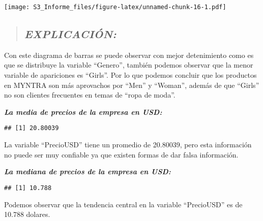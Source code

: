 \documentclass[
]{article}
\newenvironment{Shaded}{\begin{snugshade}}{\end{snugshade}}
\newcommand{\FunctionTok}[1]{\textcolor[rgb]{0.00,0.00,0.00}{#1}}
\newcommand{\NormalTok}[1]{#1}
\newcommand{\OtherTok}[1]{\textcolor[rgb]{0.56,0.35,0.01}{#1}}
\newcommand{\SpecialCharTok}[1]{\textcolor[rgb]{0.00,0.00,0.00}{#1}}
\begin{document}
\texttt{[image: S3\_Informe\_files/figure-latex/unnamed-chunk-16-1.pdf]}

\begin{quote}
\hypertarget{explicaciuxf3n-2}{%
\subsection{\texorpdfstring{\textbf{\emph{EXPLICACIÓN:}}}{EXPLICACIÓN:}}\label{explicaciuxf3n-2}}
\end{quote}

Con este diagrama de barras se puede observar con mejor detenimiento
como es que se distribuye la variable ``Genero'', también podemos
observar que la menor variable de apariciones es ``Girls''. Por lo que
podemos concluir que los productos en MYNTRA son más aprovachos por
``Men'' y ``Woman'', además de que ``Girls'' no son clientes frecuentes
en temas de ``ropa de moda''.

\textbf{\emph{La media de precios de la empresa en USD:}}

\begin{Shaded}
\end{Shaded}

\begin{verbatim}
## [1] 20.80039
\end{verbatim}

La variable ``PrecioUSD'' tiene un promedio de 20.80039, pero esta
información no puede ser muy confiable ya que existen formas de dar
falsa información.

\textbf{\emph{La mediana de precios de la empresa en USD:}}

\begin{Shaded}
\end{Shaded}

\begin{verbatim}
## [1] 10.788
\end{verbatim}

Podemos observar que la tendencia central en la variable ``PrecioUSD''
es de 10.788 dolares.
\end{document}
